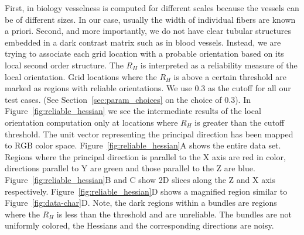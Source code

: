 First, in biology vesselness is computed for different scales because the vessels can be of different sizes. In our case, usually the width of individual fibers are known a priori.
Second, and more importantly, we do not have clear tubular structures embedded in a dark contrast matrix such as in blood vessels.
Instead, we are trying to associate each grid location  with a probable orientation based on its local second order structure. The $R_{H}$ is interpreted as a reliability measure of the local orientation.
Grid locations where the $R_{H}$ is above a certain threshold are marked as regions with reliable orientations.
We use 0.3 as the cutoff for all our test cases. (See Section~\ref{sec:param_choices} on the choice of 0.3).
In Figure~\ref{fig:reliable_hessian} we see the intermediate results of the local orientation computation only at locations where $R_{H}$ is greater than the cutoff threshold. The unit vector representing the principal direction has been mapped to RGB color space. Figure~\ref{fig:reliable_hessian}A shows the entire data set. Regions where the principal direction is parallel to the X axis are red in color, directions parallel to Y are green and those parallel to the Z are blue. Figure~\ref{fig:reliable_hessian}B and C show 2D slices along the Z and X axis respectively. Figure~\ref{fig:reliable_hessian}D shows a magnified region similar to Figure~\ref{fig:data-char}D. Note, the dark regions within a bundles are regions where the $R_H$ is less than the threshold and are unreliable. The bundles are not uniformly colored, the Hessians and the corresponding directions are noisy.

